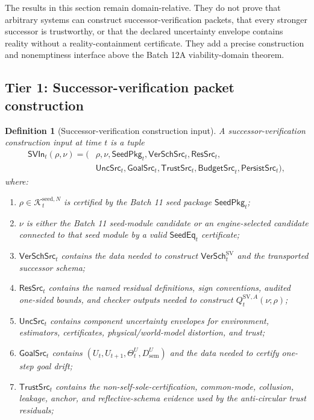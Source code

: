 \documentclass[11pt]{article}
\newtheorem{definition}[theorem]{Definition}
\newcommand{\1}{\mathbf{1}}
\providecommand{\Kcal}{\mathcal{K}}
\providecommand{\sem}{\mathrm{sem}}
\begin{document}
The results in this section remain domain-relative.  They do not prove that arbitrary systems can construct successor-verification packets, that every stronger successor is trustworthy, or that the declared uncertainty envelope contains reality without a reality-containment certificate.  They add a precise construction and nonemptiness interface above the Batch 12A viability-domain theorem.

\subsection{Tier 1: Successor-verification packet construction}

\begin{definition}[Successor-verification construction input]
\label{def:batch12b_sv_construction_input}
A successor-verification construction input at time \(t\) is a tuple
\[
\begin{aligned}
\mathsf{SVIn}_t(\rho,\nu)
=(&\rho,\nu,
\mathsf{SeedPkg}_t,
\mathsf{VerSchSrc}_t,
\mathsf{ResSrc}_t,\\
&\mathsf{UncSrc}_t,
\mathsf{GoalSrc}_t,
\mathsf{TrustSrc}_t,
\mathsf{BudgetSrc}_t,
\mathsf{PersistSrc}_t),
\end{aligned}
\]
where:
\begin{enumerate}[label=(\roman*),leftmargin=1.5em]
    \item \(\rho\in\Kcal_t^{\mathrm{seed},N}\) is certified by the Batch 11 seed package \(\mathsf{SeedPkg}_t\);
    \item \(\nu\) is either the Batch 11 seed-module candidate or an engine-selected candidate connected to that seed module by a valid \(\mathsf{SeedEq}_t\) certificate;
    \item \(\mathsf{VerSchSrc}_t\) contains the data needed to construct \(\mathsf{VerSch}_t^{\mathrm{SV}}\) and the transported successor schema;
    \item \(\mathsf{ResSrc}_t\) contains the named residual definitions, sign conventions, audited one-sided bounds, and checker outputs needed to construct \(Q_t^{\mathrm{SV},A}(\nu;\rho)\);
    \item \(\mathsf{UncSrc}_t\) contains component uncertainty envelopes for environment, estimators, certificates, physical/world-model distortion, and trust;
    \item \(\mathsf{GoalSrc}_t\) contains \((U_t,U_{t+1},\Theta_t^U,D_{\sem}^U)\) and the data needed to certify one-step goal drift;
    \item \(\mathsf{TrustSrc}_t\) contains the non-self-sole-certification, common-mode, collusion, leakage, anchor, and reflective-schema evidence used by the anti-circular trust residuals;

\end{enumerate}
\end{definition}
\end{document}
